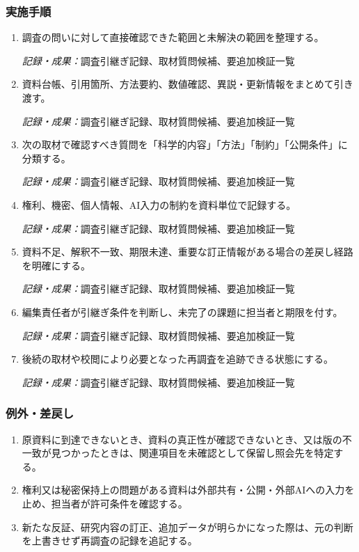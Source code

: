 \documentclass[a4paper,11pt]{article}
\begin{document}
\subsubsection*{実施手順}
\begin{enumerate}[leftmargin=2em,itemsep=0.65em]
\item 調査の問いに対して直接確認できた範囲と未解決の範囲を整理する。\par\noindent\textit{記録・成果：}調査引継ぎ記録、取材質問候補、要追加検証一覧\nobreak\smallskip
\item 資料台帳、引用箇所、方法要約、数値確認、異説・更新情報をまとめて引き渡す。\par\noindent\textit{記録・成果：}調査引継ぎ記録、取材質問候補、要追加検証一覧\nobreak\smallskip
\item 次の取材で確認すべき質問を「科学的内容」「方法」「制約」「公開条件」に分類する。\par\noindent\textit{記録・成果：}調査引継ぎ記録、取材質問候補、要追加検証一覧\nobreak\smallskip
\item 権利、機密、個人情報、AI入力の制約を資料単位で記録する。\par\noindent\textit{記録・成果：}調査引継ぎ記録、取材質問候補、要追加検証一覧\nobreak\smallskip
\item 資料不足、解釈不一致、期限未達、重要な訂正情報がある場合の差戻し経路を明確にする。\par\noindent\textit{記録・成果：}調査引継ぎ記録、取材質問候補、要追加検証一覧\nobreak\smallskip
\item 編集責任者が引継ぎ条件を判断し、未完了の課題に担当者と期限を付す。\par\noindent\textit{記録・成果：}調査引継ぎ記録、取材質問候補、要追加検証一覧\nobreak\smallskip
\item 後続の取材や校閲により必要となった再調査を追跡できる状態にする。\par\noindent\textit{記録・成果：}調査引継ぎ記録、取材質問候補、要追加検証一覧\nobreak\smallskip
\end{enumerate}
\subsubsection*{例外・差戻し}
\begin{enumerate}[leftmargin=2em,itemsep=0.35em]
\item 原資料に到達できないとき、資料の真正性が確認できないとき、又は版の不一致が見つかったときは、関連項目を未確認として保留し照会先を特定する。
\item 権利又は秘密保持上の問題がある資料は外部共有・公開・外部AIへの入力を止め、担当者が許可条件を確認する。
\item 新たな反証、研究内容の訂正、追加データが明らかになった際は、元の判断を上書きせず再調査の記録を追記する。
\end{enumerate}
\end{document}
